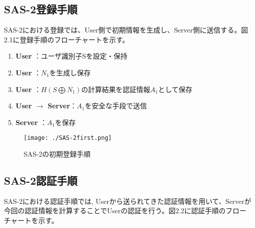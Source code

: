 \documentclass{thesis}
\begin{document}
\subsection{SAS-2登録手順}
SAS-2における登録では、User側で初期情報を生成し、Server側に送信する。図2.1に登録手順のフローチャートを示す。

\begin{enumerate}
\item \textbf{User} \hspace{49pt}：ユーザ識別子Sを設定・保持
\item \textbf{User} \hspace{49pt}：$N_1$を生成し保存
\item \textbf{User} \hspace{51pt}：$H(S \bigoplus N_1)$の計算結果を認証情報$A_1$として保存
\item \textbf{User $\rightarrow$ Server}：$A_1$を安全な手段で送信
\item \textbf{Server} \hspace{42pt}：$A_1$を保存
\end{enumerate}

\begin{figure}[H]
 \center
 \texttt{[image: ./SAS-2first.png]}
 \caption{SAS-2の初期登録手順}
\end{figure}

\subsection{SAS-2認証手順}

SAS-2における認証手順では, Userから送られてきた認証情報を用いて、Serverが今回の認証情報を計算することでUserの認証を行う。図2.2に認証手順のフローチャートを示す。
\end{document}
